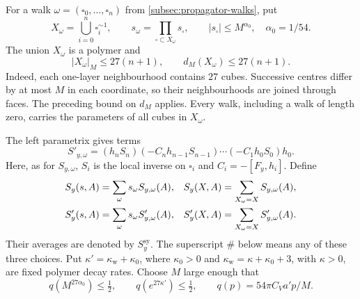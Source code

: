 For a walk $\omega=(\square_0,\ldots,\square_n)$ from
\cref{subsec:propagator-walks}, put
\[
 X_\omega=\bigcup_{i=0}^n\square_i^{\sim1},\qquad
 s_\omega=\prod_{\square\subset X_\omega}s_\square,
 \qquad |s_\square|\le M^{\alpha_0},\quad \alpha_0=1/54.
\]
The union $X_\omega$ is a polymer and
\begin{equation}\label{eq:walk-polymer-size}
 |X_\omega|_M\le27(n+1),\qquad d_M(X_\omega)\le27(n+1).
\end{equation}
Indeed, each one-layer neighbourhood contains $27$ cubes. Successive
centres differ by at most $M$ in each coordinate, so their neighbourhoods
are joined through faces. The preceding bound on $d_M$ applies.
Every walk, including a walk of length zero, carries the parameters of
all cubes in $X_\omega$.

The left parametrix gives terms
\[
 S'_{y,\omega}=(h_nS_n)(-C_nh_{n-1}S_{n-1})\cdots
                 (-C_1h_0S_0)h_0.
\]
Here, as for $S_{y,\omega}$, $S_i$ is the local inverse on
$\square_i$ and $C_i=-[F_y,h_i]$. Define
\begin{align}
 S_y(s,A)&=\sum_\omega s_\omega S_{y,\omega}(A),&
 S_y(X,A)&=\sum_{X_\omega=X}S_{y,\omega}(A),\label{eq:weakened-walk-definitions}\\
 S'_y(s,A)&=\sum_\omega s_\omega S'_{y,\omega}(A),&
 S'_y(X,A)&=\sum_{X_\omega=X}S'_{y,\omega}(A).\notag
\end{align}
Their averages are denoted by $S_y^{\mathrm{sy}}$. The superscript
$\#$ below means any of these three choices. Put
$\kappa'=\kappa_{\mathrm w}+\kappa_0$, where
$\kappa_0>0$ and $\kappa_{\mathrm w}=\kappa+\kappa_0+3$, with $\kappa>0$, are fixed polymer decay rates.
Choose $M$ large enough that
\begin{equation}\label{eq:weakened-walk-contraction}
 q(M^{27\alpha_0})\le\tfrac12,\qquad
 q(e^{27\kappa'})\le\tfrac12,
 \qquad q(p)=54\pi C_Va'p/M.
\end{equation}

